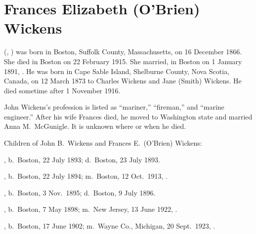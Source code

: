 \section{Frances Elizabeth (O'Brien) Wickens}

 (, ) was born in Boston, Suffolk County, Massachusetts, on 16 December 1866.\cite{Frances3OBrienBirth} She died in Boston on 22 February 1915.\cite{Frances3OBrienDeath} She married, in Boston on 1 January 1891, .\cite{JohnWickensMarriage} He was born in Cape Sable Island, Shelburne County, Nova Scotia, Canada, on 12 March 1873\cite{JohnWickensNaturalization} to Charles Wickens and Jane (Smith) Wickens.\cite{JohnWickensMarriage,JohnWickensMarriage2} He died sometime after 1 November 1916.\cite{JohnWickensMarriage2}

John Wickens's profession is listed as ``mariner,''\cite{JohnWickensMarriage} ``fireman,''\cite{JohnWickensNaturalization} and ``marine engineer.''\cite{Census1900JohnWickens} After his wife Frances died, he moved to Washington state and married Anna M.\ McGunigle.\cite{JohnWickensMarriage2} It is unknown where or when he died.

\begin{KidsIntro}
	Children of John B.\ Wickens and Frances E.\ (O'Brien) Wickens:
\end{KidsIntro}

\begin{Kids}
	, b.\ Boston, 22 July 1893;\cite{Nellie4WickensDeath} d.\ Boston, 23 July 1893.\cite{Nellie4WickensDeath}
	
	, b.\ Boston, 22 July 1894; m.\ Boston, 12 Oct.\ 1913, .
	
	, b.\ Boston, 3 Nov.\ 1895;\cite{Frederick4WickensBirth} d.\ Boston, 9 July 1896.\cite{Frederick4WickensDeath}
	
	, b.\ Boston, 7 May 1898; m.\ New Jersey, 13 June 1922, .
	
	, b.\ Boston, 17 June 1902; m.\ Wayne Co., Michigan, 20 Sept.\ 1923, .
	
\end{Kids}
